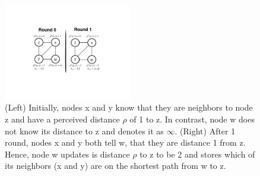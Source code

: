 \documentclass{comnet}
\begin{document}
%
\begin{figure}
\centering
\includegraphics[width=0.5\textwidth]{images/BGPSync.pdf}
\caption{(Left) Initially, nodes x and y know that they are neighbors to node z and have a perceived distance $\rho$ of 1 to z.  In contrast, node w does not know its distance to z and denotes it as $\infty$.
(Right) After 1 round, nodes x and y both tell w, that they are distance 1 from z.  Hence, node w updates is distance $\rho$ to z to be 2 and stores which of its neighbors (x and y) are on the shortest path from w to z.}
\label{fig:synchronization}
\end{figure}
%
%
%
%
\end{document}
